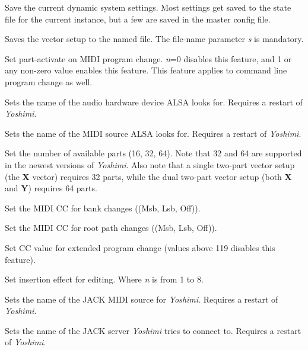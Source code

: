      Save the current dynamic system settings.
      Most settings get saved to the state file for the current instance,
      but a few are saved in the master config file.

      Saves the vector setup to the named file.
      The file-name parameter \textsl{s} is mandatory.

      Set part-activate on MIDI program change.
      \textsl{n}=0 disables this feature, and
      1 or any non-zero value enables this feature.
      This feature applies to command line program change as well.

      Sets the name of the audio hardware device ALSA looks for.
      Requires a restart of \textsl{Yoshimi}.

      Sets the name of the MIDI source ALSA looks for.
      Requires a restart of \textsl{Yoshimi}.

      Set the number of available parts (16, 32, 64).
      Note that 32 and 64 are supported in the newest versions of
      \textsl{Yoshimi}.  Also note that a single two-part vector setup (the
      \textbf{X} vector) requires 32 parts, while the dual two-part vector
      setup (both \textbf{X} and \textbf{Y}) requires 64 parts.

      Set the MIDI CC for bank changes ((Msb, Lsb, Off)).

      Set the MIDI CC for root path changes ((Msb, Lsb, Off)).

      Set CC value for extended program change (values above 119 disables this
      feature).

      Set insertion effect for editing. Where \textsl{n} is from 1 to 8.

      Sets the name of the JACK MIDI source for \textsl{Yoshimi}.
      Requires a restart of \textsl{Yoshimi}.

      Sets the name of the JACK server \textsl{Yoshimi} tries to connect to.
      Requires a restart of \textsl{Yoshimi}.

